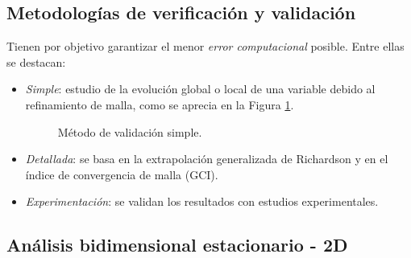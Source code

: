 \subsection{Metodolog\'ias de verificaci\'on y validaci\'on}

\noindent
\justify

Tienen por objetivo garantizar el menor \textit{error computacional} posible. Entre ellas se destacan:

\begin{itemize}
	\item \textit{Simple}: estudio de la evoluci\'on global o local de una variable debido al refinamiento de malla, como se aprecia en la Figura \ref{valsimple}.
	\begin{figure}[h!]
	\centering
	\caption{M\'etodo de validaci\'on simple.}
	\label{valsimple}
	\end{figure}
	\item \textit{Detallada}: se basa en la extrapolaci\'on generalizada de Richardson y en el \'indice de convergencia de malla (GCI).
	\item \textit{Experimentaci\'on}: se validan los resultados con estudios experimentales.
\end{itemize}

\subsection{An\'alisis bidimensional estacionario - 2D} \label{CFD2D}

\noindent
\justify

